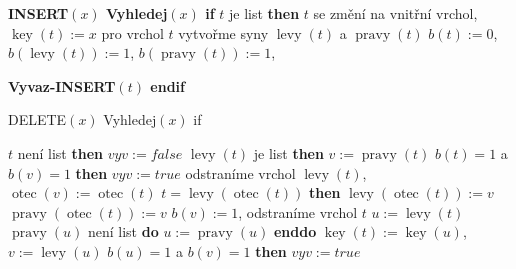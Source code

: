 \documentclass[a4paper,12pt]{article}
\DeclareMathOperator*{\otec}{otec}
\DeclareMathOperator*{\levy}{levy}
\DeclareMathOperator*{\pravy}{pravy}
\DeclareMathOperator*{\key}{key}
\begin{document}
{\bf INSERT$(x)$\newline 
Vyhledej$(x)$\newline 
if} $t$ je list {\bf then}\newline 
\phantom{---}$t$ se změní na vnitřní vrchol, $\key(t):=x$\newline 
\phantom{---}pro vrchol $t$ vytvořme syny $\levy(t)$ a $\pravy(t)$\newline 
\phantom{---}$b(t):=0$, $b(\levy(t)):=1$, $b(\pravy(t)):=1$, {\bf Vyvaz-INSERT$(t)$\newline
endif

DELETE$(x)$\newline 
Vyhledej$(x)$\newline 
if} $t$ není list {\bf then}\newline 
\phantom{---}$vyv:=false$ \newline 
\phantom{---}{\bf if} $\levy(t)$ je list {\bf then}\newline 
\phantom{------}$v:=\pravy(t)$\newline 
\phantom{------}{\bf if} $b(t)=1$ a $b(v)=1$ {\bf then}\newline 
\phantom{---------}$vyv:=true$\newline 
\phantom{------}{\bf endif}\newline 
\phantom{------}odstraníme vrchol $\levy(t)$, $\otec(v):=\otec(t)$\newline 
\phantom{------}{\bf if} $t=\levy(\otec(t))$ {\bf then}\newline 
\phantom{---------}$\levy(\otec(t)):=v$\newline 
\phantom{------}{\bf else}\newline 
\phantom{---------}$\pravy(\otec(t)):=v$\newline 
\phantom{------}{\bf endif}\newline 
\phantom{------}$b(v):=1$, odstraníme vrchol $t$\newline 
\phantom{---}{\bf else}\newline 
\phantom{------}$u:=\levy(t)$\newline 
\phantom{------}{\bf while} $\pravy(u)$ není list {\bf do} $u:=\pravy(u)$ {\bf enddo}\newline 
\phantom{------}$\key(t):=\key(u)$, $v:=\levy(u)$ \newline 
\phantom{------}{\bf if} $b(u)=1$ a $b(v)=1$ {\bf then}\newline 
\phantom{---------}$vyv:=true$\newline 
\phantom{------}{\bf endif}\newline 
\end{document}
